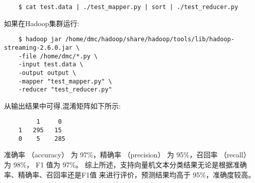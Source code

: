 \begin{lstlisting}
	$ cat test.data | ./test_mapper.py | sort | ./test_reducer.py
\end{lstlisting}
如果在Hadoop集群运行:

\begin{lstlisting}
	$ hadoop jar /home/dmc/hadoop/share/hadoop/tools/lib/hadoop-streaming-2.6.0.jar \
	-file /home/dmc/*.py \
	-input test.data \
	-output output \
	-mapper "test_mapper.py" \
	-reducer "test_reducer.py"
\end{lstlisting}
从输出结果中可得,混淆矩阵如下所示:

\begin{lstlisting}
	     1     0
	1   295   15
	0    5    285
\end{lstlisting}

准确率 （accuracy） 为 97\%，精确率 （precision） 为 95\%，召回率 （recall） 为 98\%，
F1 值为 97\%。
综上所述，支持向量机文本分类结果无论是根据准确率、精确率、召回率还是F1值
来进行评价，预测结果均高于 95\%，准确度较高。


